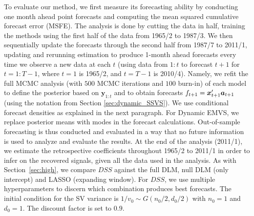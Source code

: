 \documentclass[ba]{imsart}
\numberwithin{equation}{section}
\theoremstyle{plain}
\def\x{\mbox{\boldmath$x$}}
\def\y{\mbox{\boldmath$y$}}
\def\b{\mbox{\boldmath$b$}}
\newcommand{\bm}[1]{\boldsymbol{#1}}
\renewcommand{\P}{\mathsf{P}}
\def\C {\,|\:}
\def\C {\,|\:}
\def\y{\bm{y}}
\def\b{\bm{\beta}}
\begin{document}
{To evaluate our method, we first measure its forecasting ability by conducting one month ahead point forecasts and computing the  mean squared cumulative forecast error (MSFE).
The analysis is done by cutting the data in half, training the methods using the first half of the data from 1965/2 to 1987/3.
We then sequentially update the forecasts through the second half from 1987/7 to 2011/1, updating and rerunning estimation to produce 1-month ahead forecasts every time we observe a new data at each $t$ (using data from $1{:}t$ to forecast $t+1$ for $t=1{:}T-1$, where $t=1$ is 1965/2, and $t=T-1$ is 2010/4). Namely, we refit the full  MCMC analysis (with $500$ MCMC iterations and $100$ burn-in) of each model to define the posterior based on $\y_{1:t}$ and to obtain forecasts $f_{t+1}=\x_{t+1}'\bm a_{t+1}$ (using the notation from Section \ref{sec:dynamic_SSVS}). We use conditional forecast densities as explained in the next paragraph. For Dynamic EMVS, we replace posterior means with modes in the forecast calculations.
Out-of-sample forecasting is thus conducted and evaluated in a way that {no future information is used to analyze and evaluate the results}.
At the end of the analysis (2011/1), we estimate the retrospective coefficients throughout 1965/2 to 2011/1 in order to infer on the recovered signals, given all the data used in the analysis.
As with Section~\ref{sec:high}, we compare $DSS$ against the full DLM, null DLM (only intercept)  and LASSO (expanding window).
For $DSS$, we use multiple hyperparameters   to discern which combination produces best forecasts.
{The  initial condition for the SV variance is  $1/v_{0}\sim G(n_0/2,d_0/2)$ with $n_0=1$ and $d_0=1$. The discount factor is set to $0.9$.}

}
\end{document}
